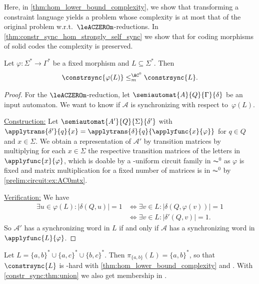 
Here, in \cref{thm:hom_lower_bound_complexity},
we show that transforming a constraint language
yields a problem whose complexity is
at most that of the original problem w.r.t.~$\leACZEROm$-reductions.
In \cref{thm:constr_sync_hom_strongly_self_sync}
we show that for coding morphisms of solid codes
the complexity is preserved.

\begin{theorem}
	\label{thm:hom_lower_bound_complexity}
	Let $\varphi \colon \Sigma^* \to \Gamma^*$ be a fixed morphism
	and $L \subseteq \Sigma^*$.
	Then \[ \constrsync{\varphi(L)} \le_m^{\AC^0} \constrsync{L}. \]
\end{theorem}
\begin{proof}
	For the $\leACZEROm$-reduction,
	let $\semiautomat{A}{Q}{\Gamma}{\delta}$ be an input automaton. 
	We want to know if $\mathcal A$ is synchronizing with respect to~$\varphi(L)$.
	
	\medskip
	\noindent\underline{Construction:} Let $\semiautomat{A'}{Q}{\Sigma}{\delta'}$
	with $\applytrans{\delta'}{q}{x} = \applytrans{\delta}{q}{\applyfunc{x}{\varphi}}$ for $q \in Q$ and $x \in \Sigma$.
	We obtain a representation of $\mathcal A'$
	by transition matrices by multiplying
	for each $x \in \Sigma$
	the respective transition matrices
	of the letters in~$\applyfunc{x}{\varphi}$,
	which is doable by a \LOGSPACE-uniform circuit family in $\AC^0$ as $\varphi$ is fixed and matrix multiplication for a fixed number of matrices is in $\AC^0$ by \cref{prelim:circuit:ex:AC0mtx}.
		
	\medskip 
	\noindent\underline{Verification:} We have
	\begin{align*}
		                  \exists u \in \varphi(L) \colon |\delta(Q, u)| = 1 
		& \Leftrightarrow \exists v \in L \colon |\delta(Q, \varphi(v))| = 1 \tag{$\varphi(v) = u$} \\
		& \Leftrightarrow \exists v \in L \colon |\delta'(Q, v)| = 1  \tag{$\delta'(Q, v) = \delta(Q, \varphi(v))$}.  
	\end{align*}
So $\mathcal A'$ has a synchronizing word in $L$ if and only if
$\mathcal A$ has a synchronizing word in $\applyfunc{L}{\varphi}$.
\end{proof}

\begin{example}
	Let $L = \{a,b\}^* \cup \{a,c\}^* \cup \{b,c\}^*$.
	Then $\pi_{\{a,b\}}(L) = \{a,b\}^*$,
	so that $\constrsync{L}$ is \NL-hard
	with \cref{thm:hom_lower_bound_complexity}
	and .
	With \cref{constr_sync:thm:union} 
	we also get membership in \NL.
\end{example}	

